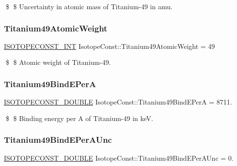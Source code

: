 \$ \$ Uncertainty in atomic mass of Titanium-\/49 in amu. \mbox{\label{group___isotope_const-_titanium-_ti49_ga6c0b329cbf7e6799adb06ca43f2c9607}} 
\subsubsection{\texorpdfstring{Titanium49\+Atomic\+Weight}{Titanium49AtomicWeight}}
{\footnotesize\ttfamily \mbox{\hyperlink{group___isotope_const-_macros_ga5f18360b3e99483a35c32d789e62621c}{I\+S\+O\+T\+O\+P\+E\+C\+O\+N\+S\+T\+\_\+\+I\+NT}} Isotope\+Const\+::\+Titanium49\+Atomic\+Weight = 49}

\$ \$ Atomic weight of Titanium-\/49. \mbox{\label{group___isotope_const-_titanium-_ti49_ga4cdc830832c489249e4331b19194ec5c}} 
\subsubsection{\texorpdfstring{Titanium49\+Bind\+E\+PerA}{Titanium49BindEPerA}}
{\footnotesize\ttfamily \mbox{\hyperlink{group___isotope_const-_macros_ga8f45a7272ce02c0b4c65c44636ed719a}{I\+S\+O\+T\+O\+P\+E\+C\+O\+N\+S\+T\+\_\+\+D\+O\+U\+B\+LE}} Isotope\+Const\+::\+Titanium49\+Bind\+E\+PerA = 8711.}

\$ \$ Binding energy per A of Titanium-\/49 in keV. \mbox{\label{group___isotope_const-_titanium-_ti49_gab862b58c00950dffca5cd6fa8a36c5e7}} 
\subsubsection{\texorpdfstring{Titanium49\+Bind\+E\+Per\+A\+Unc}{Titanium49BindEPerAUnc}}
{\footnotesize\ttfamily \mbox{\hyperlink{group___isotope_const-_macros_ga8f45a7272ce02c0b4c65c44636ed719a}{I\+S\+O\+T\+O\+P\+E\+C\+O\+N\+S\+T\+\_\+\+D\+O\+U\+B\+LE}} Isotope\+Const\+::\+Titanium49\+Bind\+E\+Per\+A\+Unc = 0.}

